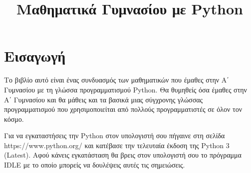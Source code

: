 \documentclass[b5paper,11pt,twoside,openleft]{memoir}
\begin{document}
\setmainfont[Mapping=tex-text,Ligatures=Common]{Arno Pro}
\setsansfont[Mapping=tex-text,Scale=MatchLowercase]{Myriad Pro}
\setmonofont[Mapping=tex-text,Scale=MatchLowercase]{Consolas}

\title{%
Μαθηματικά Γυμνασίου με Python}

\author{}
\maketitle
\thispagestyle{empty}
\chapter*	{Εισαγωγή}
Το βιβλίο αυτό είναι ένας συνδυασμός των μαθηματικών που έμαθες στην Α΄ Γυμνασίου με τη γλώσσα προγραμματισμού Python. Θα θυμηθείς όσα έμαθες στην Α΄ Γυμνασίου και θα μάθεις και τα βασικά μιας σύγχρονης γλώσσας προγραμματισμού που χρησιμοποιείται από πολλούς προγραμματιστές σε όλον τον κόσμο.

Για να εγκαταστήσεις την Python στον υπολογιστή σου πήγαινε στη σελίδα https://www.python.org/ και κατέβασε την τελευταία έκδοση της Python 3 (Latest). Αφού κάνεις εγκατάσταση θα βρεις στον υπολογιστή σου το πρόγραμμα IDLE με το οποίο μπορείς να δουλέψεις αυτές τις σημειώσεις.


%
%
%
%
%
%
%
%
\end{document}
